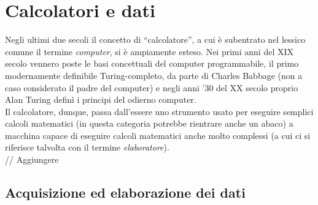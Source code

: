 
\chapter{Calcolatori e dati} %

\label{Chapter2} %


Negli ultimi due secoli il concetto di ``calcolatore'', a cui è subentrato nel
lessico comune il termine \emph{computer}, si è ampiamente esteso. Nei primi
anni del XIX secolo vennero poste le basi concettuali del computer programmabile, 
il primo modernamente definibile Turing-completo, da parte di Charles Babbage 
(non a caso considerato il padre del computer\citep{CBabbage})
e negli anni '30 del XX secolo proprio Alan Turing definì i principi del odierno computer. 
\\
Il calcolatore, dunque, passa dall'essere uno strumento usato per
eseguire semplici calcoli matematici (in questa categoria potrebbe rientrare
anche un abaco) a macchina capace di eseguire calcoli matematici anche molto 
complessi (a cui ci si riferisce talvolta con il termine \emph{elaboratore}).
\\
// Aggiungere


\section{Acquisizione ed elaborazione dei dati}

